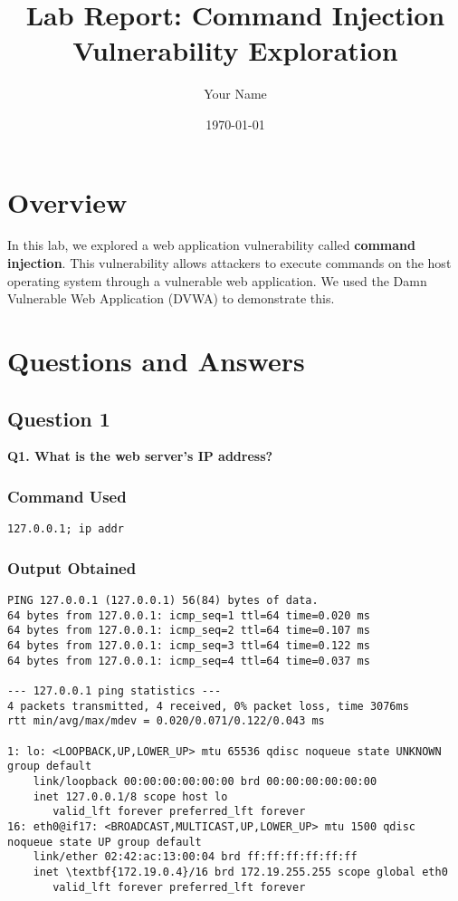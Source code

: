 \documentclass[12pt]{article}
\title{Lab Report: Command Injection Vulnerability Exploration}
\author{Your Name}
\date{\today}
\begin{document}
\maketitle

\tableofcontents

\section{Overview}

In this lab, we explored a web application vulnerability called \textbf{command injection}. This vulnerability allows attackers to execute commands on the host operating system through a vulnerable web application. We used the Damn Vulnerable Web Application (DVWA) to demonstrate this.

\section{Questions and Answers}

\subsection{Question 1}

\textbf{Q1. What is the web server’s IP address?}

\subsubsection{Command Used}

\begin{lstlisting}[style=terminal]
127.0.0.1; ip addr
\end{lstlisting}

\subsubsection{Output Obtained}

\begin{lstlisting}[style=terminal]
PING 127.0.0.1 (127.0.0.1) 56(84) bytes of data.
64 bytes from 127.0.0.1: icmp_seq=1 ttl=64 time=0.020 ms
64 bytes from 127.0.0.1: icmp_seq=2 ttl=64 time=0.107 ms
64 bytes from 127.0.0.1: icmp_seq=3 ttl=64 time=0.122 ms
64 bytes from 127.0.0.1: icmp_seq=4 ttl=64 time=0.037 ms

--- 127.0.0.1 ping statistics ---
4 packets transmitted, 4 received, 0% packet loss, time 3076ms
rtt min/avg/max/mdev = 0.020/0.071/0.122/0.043 ms

1: lo: <LOOPBACK,UP,LOWER_UP> mtu 65536 qdisc noqueue state UNKNOWN group default 
    link/loopback 00:00:00:00:00:00 brd 00:00:00:00:00:00
    inet 127.0.0.1/8 scope host lo
       valid_lft forever preferred_lft forever
16: eth0@if17: <BROADCAST,MULTICAST,UP,LOWER_UP> mtu 1500 qdisc noqueue state UP group default 
    link/ether 02:42:ac:13:00:04 brd ff:ff:ff:ff:ff:ff
    inet \textbf{172.19.0.4}/16 brd 172.19.255.255 scope global eth0
       valid_lft forever preferred_lft forever
\end{lstlisting}
\end{document}
